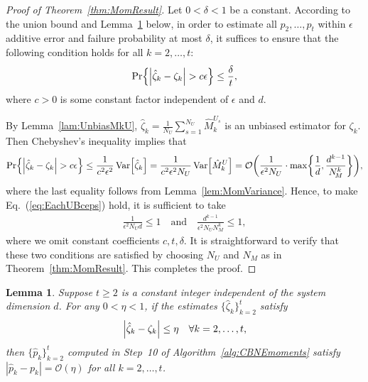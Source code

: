 \documentclass[aps,prl,twocolumn,nofootinbib,superscriptaddress,10pt]{revtex4-2}
\let\originalleft\left
\let\originalright\right
\renewcommand{\left}{\mathopen{}\mathclose\bgroup\originalleft}
\renewcommand{\right}{\aftergroup\egroup\originalright}
\DeclareMathOperator{\Var}{Var}
\newcommand{\bigo}[1]{\mathcal{O}\left(#1\right)}
\theoremstyle{plain}
\newtheorem{lemma}{Lemma}
\theoremstyle{definition}
\newcommand{\eref}[1]{Eq.~\textup{(\ref{#1})}}
\newcommand{\lref}[1]{Lemma~\ref{#1}}
\newcommand{\tref}[1]{Theorem~\ref{#1}}
\begin{document}
\begin{proof}[Proof of \tref{thm:MomResult}]
Let $0<\delta<1$ be a constant. 
According to the union bound and \lref{lem:EstimatorTrans} below, in order to estimate all 
$p_2,\dots,p_t$ within $\epsilon$ additive error and failure probability at most $\delta$, it 
suffices to ensure that the following condition holds for all $k=2,\dots,t$:  
\begin{equation}\label{eq:EachUBceps}
\Pr\left\{ \left|\hat\zeta_k-\zeta_k\right| > c\epsilon \right\} \leq \frac{\delta}{t},
\end{equation}
where $c>0$ is some constant factor independent of $\epsilon$ and $d$.  

By \lref{lam:UnbiasMkU}, $\hat\zeta_k = \frac{1}{N_U} \sum_{s=1}^{N_U} \hat{M}_k^{U_s}$ is an unbiased estimator for $\zeta_k$. 
Then Chebyshev's inequality implies that 
\begin{align}
\Pr\left\{ \left|\hat\zeta_k-\zeta_k\right| > c\epsilon \right\}
\leq \frac{1}{c^2\epsilon^2} \Var\left[ \hat\zeta_k\right] 
= \frac{1}{c^2\epsilon^2 N_U} \Var\!\Big[ \hat{M}_k^{U} \Big] 
= \bigo{\frac{1}{\epsilon^2 N_U} \cdot \max\left\lbrace \frac{1}{d} ,\frac{d^{k-1}}{N_{\!M}^{k}}\right\rbrace},  
\end{align}
where the last equality follows from \lref{lem:MomVariance}.
Hence, to make \eref{eq:EachUBceps} hold, it is sufficient to take 
\begin{align} 
\frac{1}{\epsilon^2 N_U d} \leq 1
\quad\text{and}\quad  
\frac{d^{k-1}}{\epsilon^2 N_U N_{\!M}^{k}} \leq 1 ,
\end{align}
where we omit constant coefficients $c,t,\delta$. 
It is straightforward to verify that these two conditions are satisfied by choosing $N_U$ and $N_M$ as in \tref{thm:MomResult}. 
This completes the proof. 
\end{proof}



\begin{lemma}\label{lem:EstimatorTrans}
Suppose $t\geq 2$ is a constant integer independent of the system dimension $d$. For any $0<\eta<1$, if the estimates $\{\hat{\zeta}_k\}_{k=2}^t$ satisfy
	\begin{align}\label{eq:Cond1ptTrans}
		\left| \hat{\zeta}_k - \zeta_k \right| \leq \eta \quad \forall k = 2, \dots, t,
	\end{align} 
	then $\{\hat{p}_k\}_{k=2}^t$ computed in Step~10 of Algorithm~\ref{alg:CBNEmoments} satisfy
	$|\hat{p}_k - p_k| = \mathcal{O}(\eta)$ for all $k=2,\dots,t$.
\end{lemma}
\end{document}
